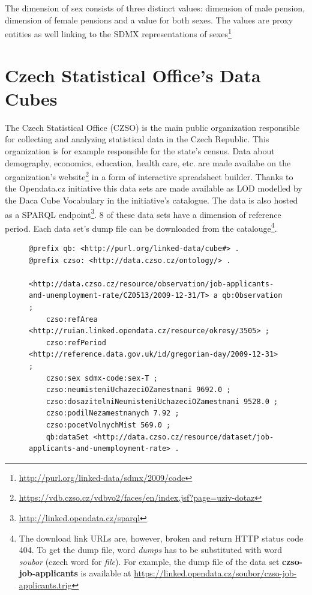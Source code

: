 The dimension of sex consists of three distinct values: dimension of male pension, dimension of female pensions and a value for both sexes. The values are proxy entities as well linking to the SDMX representations of sexes\footnote{\href{http://purl.org/linked-data/sdmx/2009/code}{http://purl.org/linked-data/sdmx/2009/code}}

\section{Czech Statistical Office's Data Cubes}

The Czech Statistical Office (CZSO) is the main public organization responsible for collecting and analyzing statistical data in the Czech Republic. This organization is for example responsible for the state's census. Data about demography, economics, education, health care, etc. are made availabe on the organization's website\footnote{\href{https://vdb.czso.cz/vdbvo2/faces/en/index.jsf?page=uziv-dotaz}{https://vdb.czso.cz/vdbvo2/faces/en/index.jsf?page=uziv-dotaz}} in a form of interactive spreadsheet builder. Thanks to the Opendata.cz initiative this data sets are made available as LOD modelled by the Daca Cube Vocabulary in the initiative's catalogue. The data is also hosted as a SPARQL endpoint\footnote{\href{http://linked.opendata.cz/sparql}{http://linked.opendata.cz/sparql}}. 8 of these data sets have a dimension of reference period. Each data set’s dump file can be downloaded from the catalouge\footnote{The download link URLs are, however, broken and return HTTP status code 404. To get the dump file, word \textit{dumps} has to be substituted with word \textit{soubor} (czech word for \textit{file}). For example, the dump file of the data set \textbf{czso-job-applicants} is available at \href{https://linked.opendata.cz/soubor/czso-job-applicants.trig}{https://linked.opendata.cz/soubor/czso-job-applicants.trig}}.

\begin{figure}[h]
\begin{lstlisting}[language = turtle, caption={Example of an observation from the CZSO data sets}, label={turtleexample},captionpos=b escapeinside={(*@}{@*)}]
@prefix qb: <http://purl.org/linked-data/cube#> .
@prefix czso: <http://data.czso.cz/ontology/> .

<http://data.czso.cz/resource/observation/job-applicants-and-unemployment-rate/CZ0513/2009-12-31/T> a qb:Observation ;
    czso:refArea <http://ruian.linked.opendata.cz/resource/okresy/3505> ;
    czso:refPeriod <http://reference.data.gov.uk/id/gregorian-day/2009-12-31> ;
    czso:sex sdmx-code:sex-T ;
    czso:neumisteniUchazeciOZamestnani 9692.0 ;
    czso:dosazitelniNeumisteniUchazeciOZamestnani 9528.0 ;
    czso:podilNezamestnanych 7.92 ;
    czso:pocetVolnychMist 569.0 ;
    qb:dataSet <http://data.czso.cz/resource/dataset/job-applicants-and-unemployment-rate> .
\end{lstlisting}
\end{figure}

